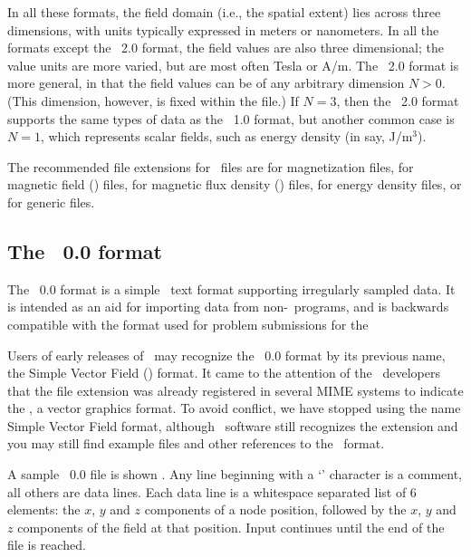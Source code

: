 In all these formats, the field domain (i.e., the spatial extent) lies
across three dimensions, with units typically expressed in meters or
nanometers.  In all the formats except the \OVF~2.0 format, the field
values are also three dimensional; the value units are more varied, but
are most often Tesla or A/m.  The \OVF~2.0 format is more general, in
that the field values can be of any arbitrary dimension $N>0$.  (This
dimension, however, is fixed within the file.)  If $N=3$, then the
\OVF~2.0 format supports the same types of data as the \OVF~1.0
format, but another common case is $N=1$, which represents scalar
fields, such as energy density (in say, J/m${}^3$).

The recommended file extensions for \OVF\ files are  for
magnetization files,  for magnetic field (\vH) files,  
for magnetic flux density (\vB) files,   for energy density
files, or  for generic files.  

\subsection{The \OVF\ 0.0 format}\label{sec:svfformat}

The \OVF\ 0.0 format is a simple \ASCII\ text
format supporting irregularly sampled data.  It is intended as an aid
for importing data from non-\OOMMF\ programs, and is backwards
compatible with the format used for problem submissions for the

Users of early releases of \OOMMF\ may recognize the \OVF\ 0.0 format
by its previous name, the Simple Vector Field (\SVF)
format.  It came to the attention of the \OOMMF\ developers that the
file extension  was already registered in several MIME systems
to indicate the
,
a vector graphics format.  To avoid conflict, we have stopped using
the name Simple Vector Field format, although \OOMMF\ software still
recognizes the  extension and you may still find example
files and other references to the \SVF\ format.

A sample \OVF\ 0.0 file is shown .  Any line beginning with a `\lb' character is
a comment, all others are data lines.  Each data line is a whitespace
separated list of 6 elements: the $x$, $y$ and $z$ components of a
node position, followed by the $x$, $y$ and $z$ components of the
field at that position.  Input continues until the end of the file is
reached.

